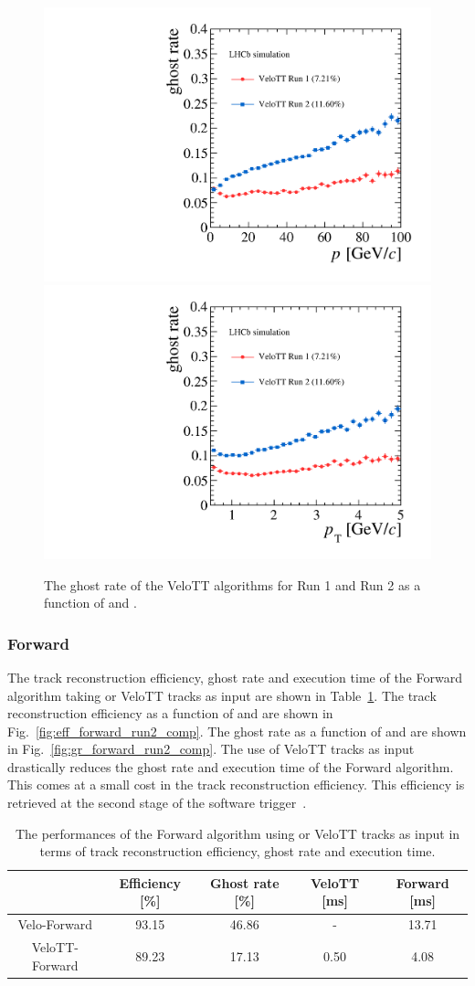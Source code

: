 \begin{figure}[!tb]
  \begin{center}
    \includegraphics[width=0.45\linewidth]{figs/upstream-tracking-run2/VeloTT-gr-p.pdf}
    \includegraphics[width=0.45\linewidth]{figs/upstream-tracking-run2/VeloTT-gr-pt.pdf}
    \caption{The ghost rate of the VeloTT algorithms for Run 1 and Run 2 as a function of \ptot and \pt.}
    \label{fig:gr_velott_comp}
  \end{center}
\end{figure}

\subsubsection{Forward}

The track reconstruction efficiency, ghost rate and execution time of the Forward algorithm taking \velo or VeloTT tracks as input are shown in Table~\ref{tab:perf_forward_run2_comp}. The track reconstruction efficiency as a function of \ptot and \pt are shown in Fig.~\ref{fig:eff_forward_run2_comp}. The ghost rate as a function of \ptot and \pt are shown in Fig.~\ref{fig:gr_forward_run2_comp}. The use of VeloTT tracks as input drastically reduces the ghost rate and execution time of the Forward algorithm. This comes at a small cost in the track reconstruction efficiency. This efficiency is retrieved at the second stage of the software trigger~\cite{hlt-run2}.

\begin{table}[!tb]
  \caption{The performances of the Forward algorithm using \velo or VeloTT tracks as input in terms of track reconstruction efficiency, ghost rate and execution time.}
  \label{tab:perf_forward_run2_comp}
  \begin{center}
    \begin{tabular}{c|c|c|c|c}
      & Efficiency [\%] & Ghost rate [\%] & VeloTT [ms] & Forward [ms] \\ 
      \hline
      Velo-Forward  & 93.15  & 46.86  &  -  & 13.71 \\ 
      VeloTT-Forward  & 89.23  & 17.13  &  0.50 & \hphantom{0}4.08 \\
    \end{tabular}
  \end{center}
\end{table}

